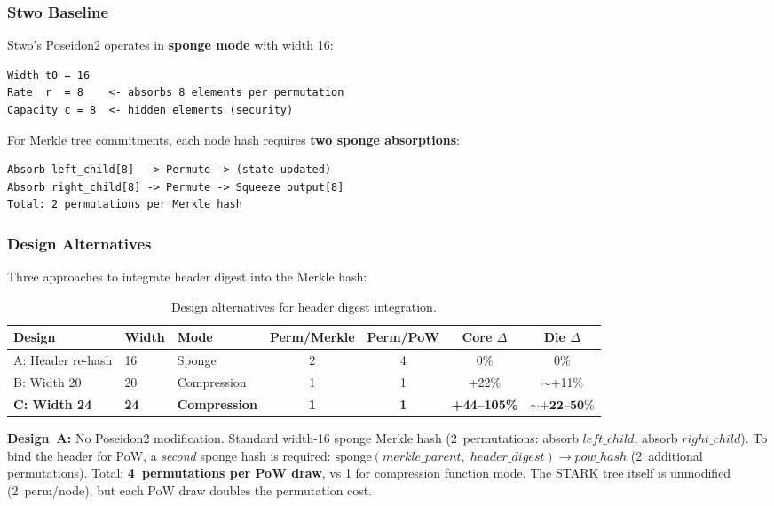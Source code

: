 \documentclass[11pt,a4paper]{article}
\begin{document}
\subsubsection{Stwo Baseline}

Stwo's Poseidon2 operates in \textbf{sponge mode} with width 16:
\begin{Verbatim}[fontsize=\small]
Width t0 = 16
Rate  r  = 8    <- absorbs 8 elements per permutation
Capacity c = 8  <- hidden elements (security)
\end{Verbatim}

For Merkle tree commitments, each node hash requires \textbf{two sponge absorptions}:
\begin{Verbatim}[fontsize=\small]
Absorb left_child[8]  -> Permute -> (state updated)
Absorb right_child[8] -> Permute -> Squeeze output[8]
Total: 2 permutations per Merkle hash
\end{Verbatim}

\subsubsection{Design Alternatives}
\label{sec:design-alt}

Three approaches to integrate header digest into the Merkle hash:

\begin{table}[h]
\centering
\small
\begin{tabular}{@{}lllcccc@{}}
\toprule
Design & Width & Mode & Perm/Merkle & Perm/PoW & Core $\Delta$ & Die $\Delta$ \\
\midrule
A: Header re-hash & 16 & Sponge & 2 & 4 & 0\% & 0\% \\
B: Width 20 & 20 & Compression & 1 & 1 & +22\% & ${\sim}$+11\% \\
\textbf{C: Width 24} & \textbf{24} & \textbf{Compression} & \textbf{1} & \textbf{1} & \textbf{+44--105\%} & $\mathbf{{\sim}\text{+22--50\%}}$ \\
\bottomrule
\end{tabular}
\caption{Design alternatives for header digest integration.}
\label{tab:designs}
\end{table}

\textbf{Design~A:} No Poseidon2 modification. Standard width-16 sponge Merkle hash (2~permutations: absorb $\mathit{left\_child}$, absorb $\mathit{right\_child}$). To bind the header for PoW, a \emph{second} sponge hash is required: $\mathrm{sponge}(\mathit{merkle\_parent},\; \mathit{header\_digest}) \to \mathit{pow\_hash}$ (2~additional permutations). Total: \textbf{4~permutations per PoW draw}, vs 1 for compression function mode. The STARK tree itself is unmodified (2~perm/node), but each PoW draw doubles the permutation cost.
\end{document}
